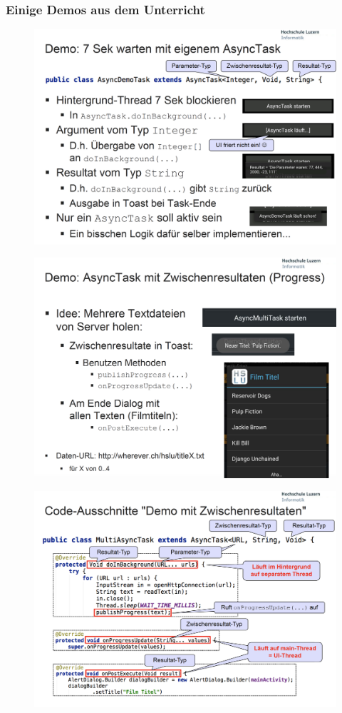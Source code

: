 \documentclass[a4paper]{article}
\begin{document}
		\subsubsection{Einige Demos aus dem Unterricht}
		\begin{figure}[htb!]
			\centering
			\includegraphics[width=.9\textwidth]{img/async_demo_01.png}
		\end{figure}
		\begin{figure}[htb!]
			\centering
			\includegraphics[width=.9\textwidth]{img/async_demo_02.png}
		\end{figure}
	\newpage
		\begin{figure}[htb!]
			\centering
			\includegraphics[width=.9\textwidth]{img/async_demo_03.png}
		\end{figure}
\end{document}
